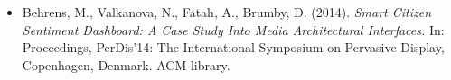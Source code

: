 \begin{acknowledgements}
\begin{singlespace}
{\begin{itemize}

\item Behrens, M., Valkanova, N., Fatah, A., Brumby, D. (2014). \textit{Smart Citizen Sentiment Dashboard: A Case Study Into Media Architectural Interfaces.} In: Proceedings, PerDis’14: The International Symposium on Pervasive Display, Copenhagen, Denmark. ACM library.


\end{itemize}}
\end{singlespace}
\end{acknowledgements}
